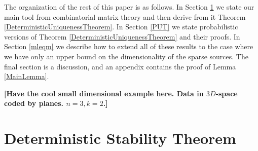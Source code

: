 \documentclass[journal, onecolumn]{IEEEtran}
\begin{document}
The organization of the rest of this paper is as follows. In Section \ref{DUT} we state our main tool from combinatorial matrix theory and then derive from it Theorem \ref{DeterministicUniquenessTheorem}. In Section \ref{PUT} we state probabilistic versions of Theorem \ref{DeterministicUniquenessTheorem} and their proofs. In Section \ref{mleqm} we describe how to extend all of these results to the case where we have only an upper bound on the dimensionality of the sparse sources. The final section is a discussion, and an appendix contains the proof of Lemma \ref{MainLemma}.

\textbf{[Have the cool small dimensional example here. Data in $3D$-space coded by planes. $n=3, k=2$.]}


 

\section{Deterministic Stability Theorem}\label{DUT}

\end{document}

